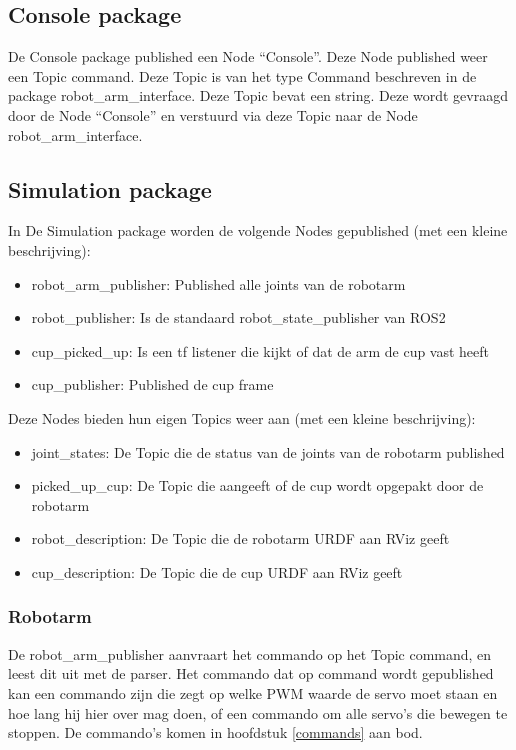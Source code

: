 \documentclass[12pt, legalpaper]{article}
\begin{document}
    \subsection{Console package}
    De Console package published een Node ``Console''.
    Deze Node published weer een Topic command. Deze Topic is van het type Command beschreven in de package robot\_arm\_interface.
    Deze Topic bevat een string. Deze wordt gevraagd door de Node ``Console'' en verstuurd via deze Topic naar de Node robot\_arm\_interface.

    \subsection{Simulation package}
    In De Simulation package worden de volgende Nodes gepublished (met een kleine beschrijving):
    \begin{itemize}
        \item robot\_arm\_publisher: Published alle joints van de robotarm
        \item robot\_publisher: Is de standaard robot\_state\_publisher van ROS2
        \item cup\_picked\_up: Is een tf listener die kijkt of dat de arm de cup vast heeft
        \item cup\_publisher: Published de cup frame
    \end{itemize}
    Deze Nodes bieden hun eigen Topics weer aan (met een kleine beschrijving):
    \begin{itemize}
        \item joint\_states: De Topic die de status van de joints van de robotarm published
        \item picked\_up\_cup: De Topic die aangeeft of de cup wordt opgepakt door de robotarm
        \item robot\_description: De Topic die de robotarm URDF aan RViz geeft
        \item cup\_description: De Topic die de cup URDF aan RViz geeft
    \end{itemize}

    \subsubsection{Robotarm}
    De robot\_arm\_publisher aanvraart het commando op het Topic command, en leest dit uit met de parser.
    Het commando dat op command wordt gepublished kan een commando zijn die zegt op welke PWM waarde de servo moet staan en hoe lang hij hier over mag doen, of een commando om alle servo's die bewegen te stoppen.
    De commando's komen in hoofdstuk \ref{commands} aan bod.
\end{document}
